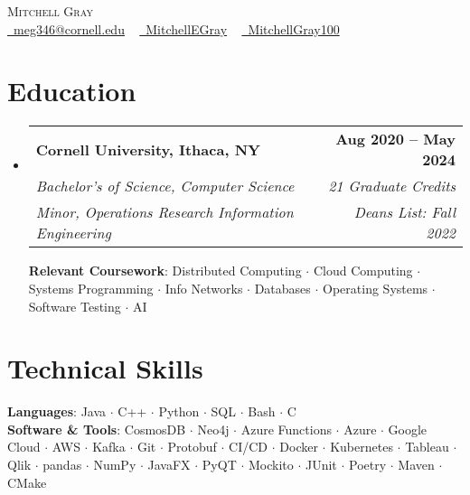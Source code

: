 \documentclass[letterpaper,11pt]{article}
\makeatletter
\newcommand{\resumeSpecialSubheading}[6]{
  \vspace{-2pt}\item
    \begin{tabular*}{1.0\textwidth}[t]{l@{\extracolsep{\fill}}r}
      \textbf{#1} & \textbf{\small #2} \\
      \textit{\small#3} & \textit{\small #4} \\
      \textit{\small#5} & \textit{\small #6} \\
    \end{tabular*}\vspace{-7pt}
}
\newcommand{\resumeSubHeadingListStart}{\begin{itemize}[leftmargin=0.0in, label={}]}
\newcommand{\resumeSubHeadingListEnd}{\end{itemize}}
\makeatother
\begin{document}
\begin{center}
    {\Huge \scshape Mitchell Gray} \\ \vspace{1pt}
    \small
    \href{mailto:youremail@gmail.com}{\faEnvelope\ meg346@cornell.edu} ~ 
    \href{https://www.linkedin.com/in/mitchellegray/}{\faLinkedin\ MitchellEGray}  ~
    \href{https://github.com/MitchellGray100}{\faGithub\ MitchellGray100}
    \vspace{-8pt}
\end{center}


\section{Education}
  \resumeSubHeadingListStart
    \resumeSpecialSubheading
      {Cornell University, Ithaca, NY}{Aug 2020 -- May 2024}
      {Bachelor's of Science, Computer Science}{21 Graduate Credits}
      {Minor, Operations Research Information Engineering}{Deans List: Fall 2022}

      \textbf{Relevant Coursework}: Distributed Computing $\cdot$ Cloud 
      Computing $\cdot$ Systems Programming $\cdot$ Info Networks $\cdot$ Databases 
      $\cdot$ Operating Systems $\cdot$ Software Testing $\cdot$ AI 
               

  \resumeSubHeadingListEnd
\vspace{-18pt}

\section{Technical Skills}
 \begin{itemize}[leftmargin=0.1in, label={}]
    \small{\item{
     \textbf{Languages}{: Java $\cdot$ C++ $\cdot$ Python $\cdot$ SQL $\cdot$ Bash $\cdot$ C} \\
     \textbf{Software \& Tools}{: 
     CosmosDB $\cdot$ Neo4j $\cdot$ 
     Azure Functions $\cdot$ Azure $\cdot$ Google Cloud $\cdot$ AWS $\cdot$ Kafka $\cdot$
     Git $\cdot$ Protobuf $\cdot$ CI/CD $\cdot$ Docker $\cdot$ Kubernetes
     $\cdot$ Tableau $\cdot$ Qlik $\cdot$ pandas $\cdot$ NumPy $\cdot$
     JavaFX $\cdot$ PyQT $\cdot$ 
     Mockito $\cdot$ JUnit $\cdot$
     Poetry $\cdot$ Maven $\cdot$ CMake}\\
    }}
 \end{itemize}
 \vspace{-20pt}
\end{document}
